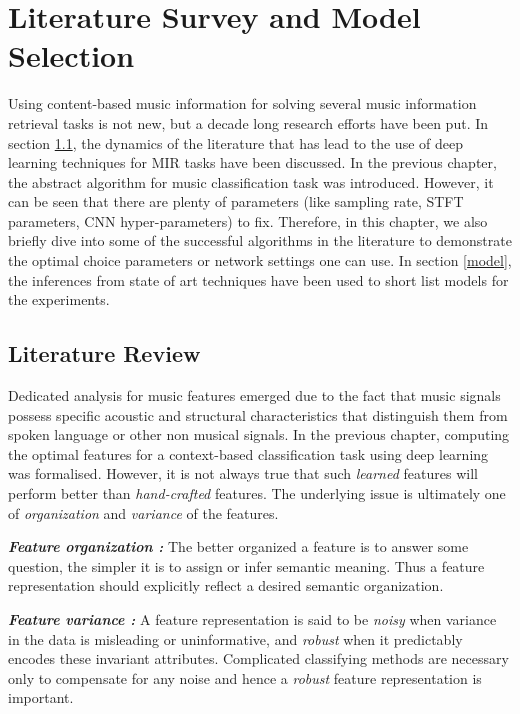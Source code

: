 


\chapter{Literature Survey and Model Selection } %

\label{Chapter3} %

Using content-based music information for solving several music information retrieval tasks is not new, but a decade long research efforts have been put. In section \ref{literature}, the dynamics of the literature that has lead to the use of deep learning techniques for MIR tasks have been discussed. In the previous chapter, the abstract algorithm for music classification task was introduced. However, it can be seen that there are plenty of parameters (like sampling rate, STFT parameters, CNN hyper-parameters) to fix. Therefore, in this chapter, we also briefly dive into some of the successful algorithms in the literature to demonstrate the optimal choice parameters or network settings one can use. In section \ref{model}, the inferences from state of art techniques have been used to short list models for the experiments.       


\section{Literature Review}
\label{literature}
Dedicated analysis for music features emerged due to the fact that music signals possess specific acoustic and structural characteristics that distinguish them from spoken language or other non musical signals. In the previous chapter, computing the optimal features for a context-based classification task using deep learning was formalised. However, it is not always true that such \textit{learned} features will perform better than \textit{hand-crafted} features. The underlying issue is ultimately one of \textit{organization} and \textit{variance} of the features. 
\bigskip 

\noindent \textit{\textbf{Feature organization :}} The better organized a feature is to answer some question, the simpler it is to assign or infer semantic meaning. Thus a feature representation should explicitly reflect a desired semantic organization. 

\noindent \textit{\textbf{Feature variance :}} A feature representation is said to be \textit{noisy} when variance in the data is misleading or uninformative, and \textit{robust} when it predictably encodes these invariant attributes. Complicated classifying methods are necessary only to compensate for any noise and hence a \textit{robust} feature representation is important.
\bigskip

